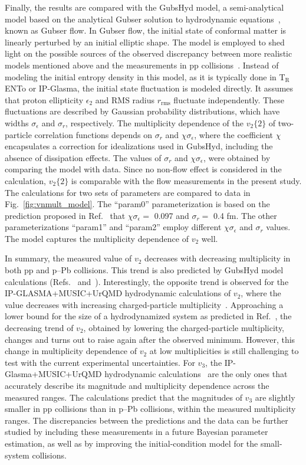 Finally, the results are compared with the GubsHyd model, a semi-analytical model based on the analytical Gubser solution to hydrodynamic equations~\cite{Gubser:2010ze,Gubser:2010ui}, known as Gubser flow. In Gubser flow, the initial state of conformal matter is linearly perturbed by an initial elliptic shape. The model is employed to shed light on the possible sources of the observed discrepancy between more realistic models mentioned above and the measurements in pp collisions~\cite{Taghavi:2019mqz}. Instead of modeling the initial entropy density in this model, as it is typically done in T$_{\text{R}}$ENTo or IP-Glasma, the initial state fluctuation is modeled directly. It assumes that proton ellipticity $\epsilon_{2}$ and RMS radius $r_{\text{rms}}$ fluctuate independently. These fluctuations are described by Gaussian probability distributions, which have widths $\sigma_{\epsilon}$
 and $\sigma_{r}$, respectively. The multiplicity dependence of the $v_2\{2\}$ of two-particle correlation functions depends on $\sigma_{r}$ and  $\chi\sigma_{\epsilon}$, where the coefficient $\chi$ encapsulates a correction for idealizations used in GubsHyd, including the absence of dissipation effects. The values of $\sigma_{r}$ and  $\chi\sigma_{\epsilon}$, were obtained by comparing the model with data. Since no non-flow effect is considered in the calculation, $v_2\{2\}$ is comparable with the flow measurements in the present study. The calculations for two sets of parameters are compared
to data in Fig.~\ref{fig:vnmult_model}. The “param0” parameterization is based on the prediction proposed in Ref.~\cite{Taghavi:2019mqz} that $\chi \sigma_{\epsilon} =$ 0.097 and $\sigma_{r} =$ 0.4 fm. The other parameterizations “param1” and “param2” employ different $\chi \sigma_{\epsilon}$  and $\sigma_{r}$ values. The model captures the multiplicity dependence of $v_2$ well.

In summary, the measured value of $v_{2}$ decreases with decreasing multiplicity in both pp and p--Pb collisions. This trend is also predicted by GubsHyd model calculations (Refs.~\cite{Taghavi:2019mqz} and~\cite{Weller:2017tsr}). Interestingly, the opposite trend is observed for the IP-GLASMA+MUSIC+UrQMD hydrodynamic calculations of $v_2$, where the value decreases with increasing charged-particle multiplicity~\cite{Schenke:2020mbo}.
Approaching a lower bound for the size of a hydrodynamized
system as predicted in Ref.~\cite{Taghavi:2019mqz}, 
the decreasing trend of $v_2$, obtained by lowering the charged-particle multiplicity, changes and turns out to raise again after the observed minimum. However, this change in multiplicity dependence of $v_2$ at low multiplicities is still challenging to test with the current experimental uncertainties. For $v_3$, the IP-Glasma+MUSIC+UrQMD hydrodynamic calculations~\cite{Schenke:2020mbo} are the only ones that accurately describe its magnitude and multiplicity dependence across the measured ranges. The calculations predict that the magnitudes of $v_3$ are slightly smaller in pp collisions than in p--Pb collisions, within the measured multiplicity ranges. The discrepancies between the predictions and the data can be further studied by including these measurements in a future Bayesian parameter estimation, as well as by improving the initial-condition model for the small-system collisions.

